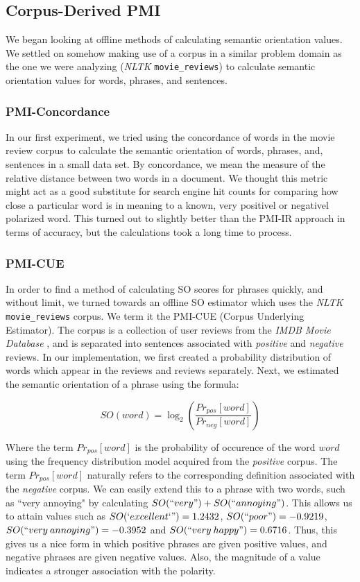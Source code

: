 \documentclass[11pt]{report} %
\begin{document}
\subsection{Corpus-Derived PMI}
We began looking at offline methods of calculating semantic orientation values. We settled on somehow making use of a corpus in a similar problem domain as the one we were analyzing (\textit{NLTK} \verb|movie_reviews|) to calculate semantic orientation values for words, phrases, and sentences. 

\subsubsection{PMI-Concordance}
In our first experiment, we tried using the concordance of words in the movie review corpus to calculate the semantic orientation of words, phrases, and, sentences in a small data set. By concordance, we mean the measure of the relative distance between two words in a document. We thought this metric might act as a good substitute for search engine hit counts for comparing how close a particular word is in meaning to a known, very positivel or negativel polarized word. This turned out to slightly better than the PMI-IR approach in terms of accuracy, but the calculations took a  long time to process.

\subsubsection{PMI-CUE}
In order to find a method of calculating SO scores for phrases quickly, and without limit, we turned towards an offline SO estimator which uses the \textit{NLTK} \verb|movie_reviews| corpus. We term it the PMI-CUE (Corpus Underlying Estimator). The corpus is a collection of user reviews from the \textit{IMDB Movie Database} , and is separated into sentences associated with \textit{positive} and \textit{negative} reviews. In our implementation, we first created a probability distribution of words which appear in the  reviews and  reviews separately. Next, we estimated the semantic orientation of a phrase using the formula:

\begin{equation*} SO(word) = \log_2 \left(\frac{Pr_{pos}[word]}{Pr_{neg}[word]}\right) \end{equation*}

Where the term $Pr_{pos}[word]$ is the probability of occurence of the word $word$ using the frequency distribution model acquired from the \textit{positive} corpus. The term $Pr_{pos}[word]$ naturally refers to the corresponding definition associated with the \textit{negative} corpus. We can easily extend this to a phrase with two words, such as ``very annoying" by calculating $SO(``very") + SO(``annoying")$. This allows us to attain values such as $SO(`excellent`")=1.2432$, $SO(``poor")=-0.9219$, $SO(``very \: annoying")=-0.3952$ and $SO(``very \: happy")=0.6716$. Thus, this gives us a nice form in which positive phrases are given positive values, and negative phrases are given negative values. Also, the magnitude of a value indicates a stronger association with the polarity.
\end{document}
